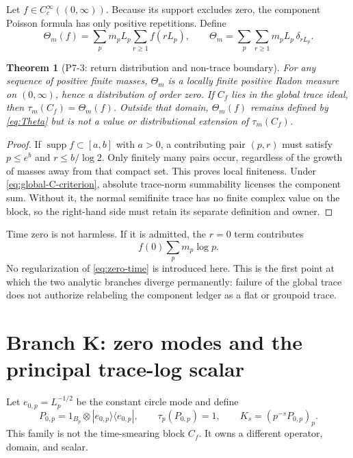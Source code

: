 \documentclass[11pt,a4paper]{article}
\newtheorem{theorem}{Theorem}[section]
\theoremstyle{definition}
\newcommand{\supp}{\operatorname{supp}}
\begin{document}
Let $f\in C_c^\infty((0,\infty))$.  Because its support excludes zero, the
component Poisson formula has only positive repetitions.  Define
\begin{equation}
 \Theta_m(f)
 =\sum_p m_pL_p\sum_{r\geq1}f(rL_p),
 \qquad
 \Theta_m=\sum_p\sum_{r\geq1}m_pL_p\,\delta_{rL_p}.
 \label{eq:Theta}
\end{equation}

\begin{theorem}[P7-3: return distribution and non-trace boundary]
\label{thm:p73}
For any sequence of positive finite masses, $\Theta_m$ is a locally finite
positive Radon measure on $(0,\infty)$, hence a distribution of order zero.
If $C_f$ lies in the global trace ideal, then
$\tau_m(C_f)=\Theta_m(f)$.  Outside that domain, $\Theta_m(f)$ remains defined
by \eqref{eq:Theta} but is not a value or distributional extension of
$\tau_m(C_f)$.
\end{theorem}

\begin{proof}
If $\supp f\subset[a,b]$ with $a>0$, a contributing pair $(p,r)$ must satisfy
$p\leq e^b$ and $r\leq b/\log2$.  Only finitely many pairs occur, regardless
of the growth of masses away from that compact set.  This proves local
finiteness.  Under \eqref{eq:global-C-criterion}, absolute trace-norm
summability licenses the component sum.  Without it, the normal semifinite
trace has no finite complex value on the block, so the right-hand side must
retain its separate definition and owner.
\end{proof}

Time zero is not harmless.  If it is admitted, the $r=0$ term contributes
\begin{equation}
 f(0)\sum_p m_p\log p.
 \label{eq:zero-time}
\end{equation}
No regularization of \eqref{eq:zero-time} is introduced here.  This is the
first point at which the two analytic branches diverge permanently: failure
of the global trace does not authorize relabeling the component ledger as a
flat or groupoid trace.

\section{Branch K: zero modes and the principal trace-log scalar}
\label{sec:branch-k}

Let $e_{0,p}=L_p^{-1/2}$ be the constant circle mode and define
\begin{equation}
 P_{0,p}=1_{B_p}\otimes |e_{0,p}\rangle\langle e_{0,p}|,
 \qquad \tau_p(P_{0,p})=1,
 \qquad K_s=(p^{-s}P_{0,p})_p .
 \label{eq:zero-mode}
\end{equation}
This family is not the time-smearing block $C_f$.  It owns a different
operator, domain, and scalar.
\end{document}
